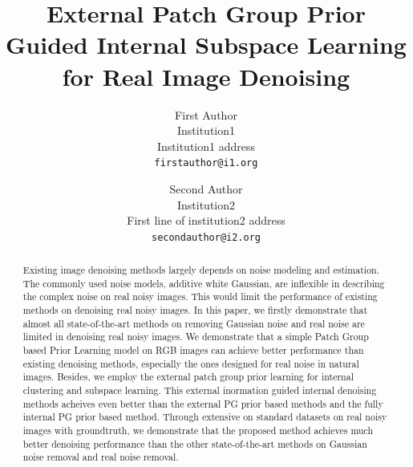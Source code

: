 \documentclass[10pt,twocolumn,letterpaper]{article}
\begin{document}
\title{External Patch Group Prior Guided Internal Subspace Learning for Real Image Denoising}

\author{First Author\\
Institution1\\
Institution1 address\\
{\tt\small firstauthor@i1.org}
\and
Second Author\\
Institution2\\
First line of institution2 address\\
{\tt\small secondauthor@i2.org}
}

\maketitle

\begin{abstract}
Existing image denoising methods largely depends on noise modeling and estimation. The commonly used noise models, additive white Gaussian, are inflexible in describing the complex noise on real noisy images. This would limit the performance of existing methods on denoising real noisy images. In this paper, we firstly demonstrate that almost all state-of-the-art methods on removing Gaussian noise and real noise are limited in denoising real noisy images. We demonstrate that a simple Patch Group based Prior Learning model on RGB images can achieve better performance than existing denoising methods, especially the ones designed for real noise in natural images. Besides, we employ the external patch group prior learning for internal clustering and subspace learning. This external inormation guided internal denoising methods acheives even better than the external PG prior based methods and the fully internal PG prior based method. Through extensive on standard datasets on real noisy images with groundtruth, we demonstrate that the proposed method achieves much better denoising performance than the other state-of-the-art methods on Gaussian noise removal and real noise removal. 
\end{abstract}

\end{document}
